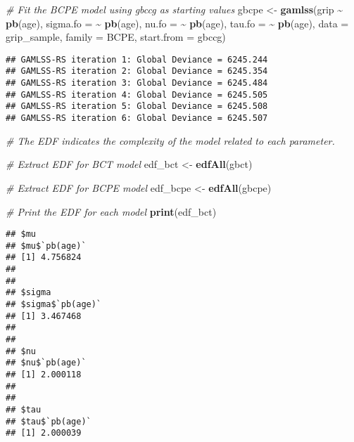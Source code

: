 \documentclass[
]{article}
\newenvironment{Shaded}{\begin{snugshade}}{\end{snugshade}}
\newcommand{\AttributeTok}[1]{\textcolor[rgb]{0.13,0.29,0.53}{#1}}
\newcommand{\CommentTok}[1]{\textcolor[rgb]{0.56,0.35,0.01}{\textit{#1}}}
\newcommand{\FunctionTok}[1]{\textcolor[rgb]{0.13,0.29,0.53}{\textbf{#1}}}
\newcommand{\NormalTok}[1]{#1}
\newcommand{\OtherTok}[1]{\textcolor[rgb]{0.56,0.35,0.01}{#1}}
\newcommand{\SpecialCharTok}[1]{\textcolor[rgb]{0.81,0.36,0.00}{\textbf{#1}}}
\begin{document}
\begin{Shaded}
\begin{Highlighting}[]
\CommentTok{\# Fit the BCPE model using gbccg as starting values}
\NormalTok{gbcpe }\OtherTok{\textless{}{-}} \FunctionTok{gamlss}\NormalTok{(grip }\SpecialCharTok{\textasciitilde{}} \FunctionTok{pb}\NormalTok{(age),}
                \AttributeTok{sigma.fo =} \SpecialCharTok{\textasciitilde{}} \FunctionTok{pb}\NormalTok{(age),}
                \AttributeTok{nu.fo =} \SpecialCharTok{\textasciitilde{}} \FunctionTok{pb}\NormalTok{(age),}
                \AttributeTok{tau.fo =} \SpecialCharTok{\textasciitilde{}} \FunctionTok{pb}\NormalTok{(age),}
                \AttributeTok{data =}\NormalTok{ grip\_sample,}
                \AttributeTok{family =}\NormalTok{ BCPE,}
                \AttributeTok{start.from =}\NormalTok{ gbccg)}
\end{Highlighting}
\end{Shaded}

\begin{verbatim}
## GAMLSS-RS iteration 1: Global Deviance = 6245.244 
## GAMLSS-RS iteration 2: Global Deviance = 6245.354 
## GAMLSS-RS iteration 3: Global Deviance = 6245.484 
## GAMLSS-RS iteration 4: Global Deviance = 6245.505 
## GAMLSS-RS iteration 5: Global Deviance = 6245.508 
## GAMLSS-RS iteration 6: Global Deviance = 6245.507
\end{verbatim}

\begin{Shaded}
\begin{Highlighting}[]
\CommentTok{\# The EDF indicates the complexity of the model related to each parameter.}

\CommentTok{\# Extract EDF for BCT model}
\NormalTok{edf\_bct }\OtherTok{\textless{}{-}} \FunctionTok{edfAll}\NormalTok{(gbct)}

\CommentTok{\# Extract EDF for BCPE model}
\NormalTok{edf\_bcpe }\OtherTok{\textless{}{-}} \FunctionTok{edfAll}\NormalTok{(gbcpe)}

\CommentTok{\# Print the EDF for each model}
\FunctionTok{print}\NormalTok{(edf\_bct)}
\end{Highlighting}
\end{Shaded}

\begin{verbatim}
## $mu
## $mu$`pb(age)`
## [1] 4.756824
## 
## 
## $sigma
## $sigma$`pb(age)`
## [1] 3.467468
## 
## 
## $nu
## $nu$`pb(age)`
## [1] 2.000118
## 
## 
## $tau
## $tau$`pb(age)`
## [1] 2.000039
\end{verbatim}
\end{document}
